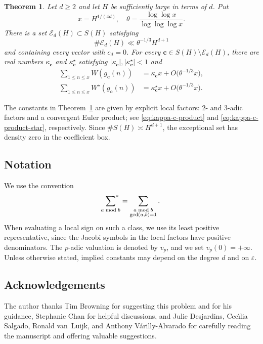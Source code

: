 \documentclass[12pt,reqno]{amsart}
\numberwithin{equation}{section}
\newtheorem{theorem}{Theorem}[section]
\theoremstyle{definition}
\renewcommand{\le}{\leqslant}
\renewcommand{\ge}{\geqslant}
\newcommand{\sumstar}{\sideset{}{^*}\sum}
\newcommand{\cc}{\mathbf{c}}
\newcommand{\rw}{W}
\begin{document}
\begin{theorem}\label{thm:main}
Let $d\ge2$ and let $H$ be sufficiently large in terms of $d$.
Put
\[
x=H^{1/(4d)},
\quad
\theta=\frac{\log\log x}{\log\log\log x}.
\]
There is a set $\mathcal E_d(H)\subset S(H)$ satisfying
\[
\#\mathcal E_d(H)\ll\theta^{-1/3}H^{d+1}
\]
and containing every vector with $c_d=0$.
For every $\cc\in S(H)\setminus\mathcal E_d(H)$, there are real numbers $\kappa_\cc$ and $\kappa_\cc^\star$ satisfying $|\kappa_\cc|,|\kappa_\cc^\star|<1$ and
\begin{align}
\sum_{1\le n\le x}\rw(g_\cc(n))
&=\kappa_\cc x+O\bigl(\theta^{-1/3}x\bigr),
\label{eq:main-fixed}\\
\sum_{1\le n\le x}\rw^\star(g_\cc(n))
&=\kappa_\cc^\star x+O\bigl(\theta^{-1/3}x\bigr).
\label{eq:main-fixed-star}
\end{align}
\end{theorem}

The constants in Theorem~\ref{thm:main} are given by explicit local factors: $2$- and $3$-adic factors and a convergent Euler product; see \eqref{eq:kappa-c-product} and \eqref{eq:kappa-c-product-star}, respectively.
Since $\#S(H)\asymp H^{d+1}$, the exceptional set has density zero in the coefficient box.

\subsection*{Notation}

We use the convention
\begin{equation}\label{eq:starred-sum-convention}
\sumstar_{a\bmod b}
=\sum_{\substack{a\bmod b\\\gcd(a,b)=1}}.
\end{equation}
When evaluating a local sign on such a class, we use its least positive representative, since the Jacobi symbols in the local factors have positive denominators.
The $p$-adic valuation is denoted by $v_p$, and we set $v_p(0)=+\infty$.
Unless otherwise stated, implied constants may depend on the degree \(d\) and on $\varepsilon$.

\subsection*{Acknowledgements}

The author thanks Tim Browning for suggesting this problem and for his guidance, Stephanie Chan for helpful discussions, and Julie Desjardins, Cec\'{\i}lia Salgado, Ronald van~Luijk, and Anthony V\'arilly-Alvarado for carefully reading the manuscript and offering valuable suggestions.
\end{document}
